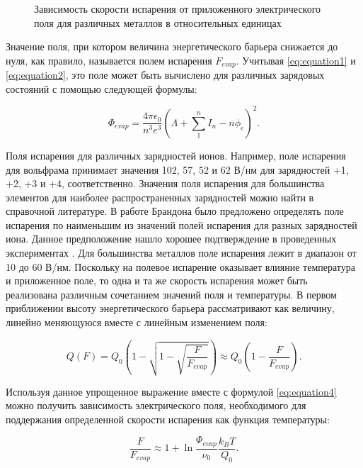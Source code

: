 \begin{figure}[ht]
	\caption{Зависимость скорости испарения от приложенного электрического поля для различных металлов в относительных единицах~\cite{Tsong78}}
	\label{fig:evapspeed}
\end{figure} 

Значение поля, при котором величина энергетического барьера снижается до нуля, как правило, называется полем испарения $F_{evap}$. Учитывая \cref{eq:equation1} и \cref{eq:equation2}, это поле может быть вычислено для различных зарядовых состояний с помощью следующей формулы: 

\begin{equation}
	\label{eq:equation5}
	\Phi_{evap} = \frac{4\pi\epsilon_0}{n^3 e^3}(\Lambda + \sum_{1}^{n} I_n - n\phi_e)^2.
\end{equation}

Поля испарения для различных зарядностей ионов. Например, поле испарения для вольфрама принимает значения 102, 57, 52 и 62 В/нм для зарядностей +1, +2, +3 и +4, соответственно. Значения поля испарения для большинства элементов для наиболее распространенных зарядностей можно найти в справочной литературе. В работе Брандона \cite{Brandon65} было предложено определять поле испарения по наименьшим из значений полей испарения для разных зарядностей иона. Данное предположение нашло хорошее подтверждение в проведенных экспериментах \cite{Tsong782}. Для большинства металлов поле испарения лежит в диапазон от 10 до 60 В/нм.
Поскольку на полевое испарение оказывает влияние температура и приложенное поле, то одна и та же скорость испарения может быть реализована различным сочетанием значений поля и температуры. В первом приближении высоту энергетического барьера рассматривают как величину, линейно меняющуюся вместе с линейным изменением поля:
 
\begin{equation}
	\label{eq:equation6}
	Q(F) = Q_0(1 - \sqrt{1 - \sqrt{\frac{F}{F_{evap}}}}) \approx Q_0 (1 - \frac{F}{F_{evap}}).
\end{equation}

Используя данное упрощенное выражение вместе с формулой \cref{eq:equation4} можно получить зависимость электрического поля, необходимого для поддержания определенной скорости испарения как функция температуры:

\begin{equation}
	\label{eq:equation7}
	\frac{F}{F_{evap}} \approx 1 + \ln{\frac{\Phi_{evap}}{\nu_0}\frac{k_B T}{Q_0}}.
\end{equation}

